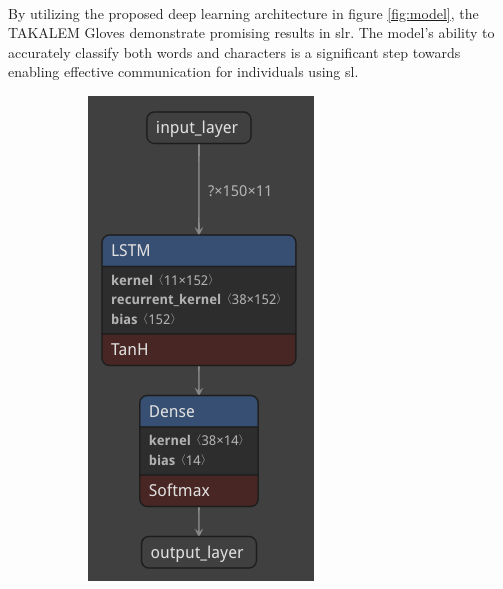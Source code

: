 \paragraph{}
By utilizing the proposed deep learning architecture in figure \ref{fig:model}, the TAKALEM Gloves demonstrate promising results in \ac{slr}. The model's ability to accurately classify both words and characters is a significant step towards enabling effective communication for individuals using \ac{sl}.
\begin{figure}[h]
	\centering
	\begin{subfigure}[b]{0.2\textwidth}
		\includegraphics[width=\textwidth]{images/model_words}

\end{subfigure}
\end{figure}
